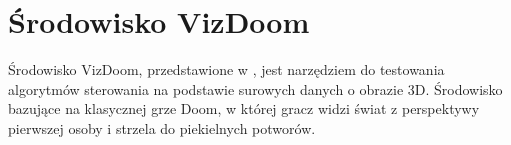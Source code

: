 \section{Środowisko VizDoom}

Środowisko VizDoom, przedstawione w \cite{DBLP:journals/corr/KempkaWRTJ16}, jest narzędziem do testowania algorytmów sterowania na podstawie surowych danych o obrazie 3D. Środowisko bazujące na klasycznej grze Doom, w której gracz widzi świat z perspektywy pierwszej osoby i strzela do piekielnych potworów.
